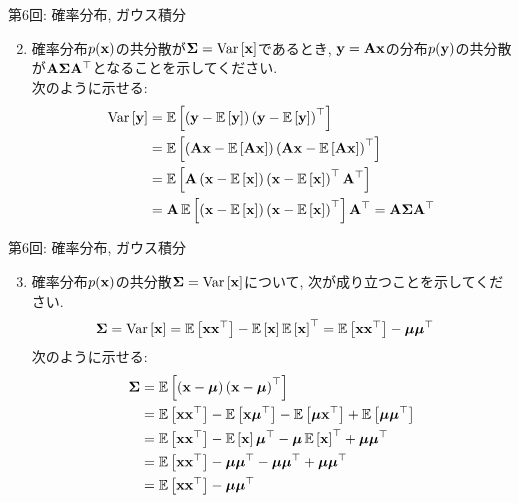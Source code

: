 \documentclass[dvipdfmx,notheorems,t]{beamer}
\begin{document}
\begin{frame}{第6回: 確率分布, ガウス積分}
\begin{enumerate}
  \setcounter{enumi}{1}
  \item 確率分布$p(\vb{x})$の共分散が$\vb{\Sigma} = \Var{\vb{x}}$であるとき,
  $\vb{y} = \vb{A} \vb{x}$の分布$p(\vb{y})$の共分散が$\vb{A} \vb{\Sigma} \vb{A}^\top$となることを示してください. \\
  次のように示せる:
  \begin{align*}
    \Var{\vb{y}}
    &= \E{\left( \vb{y} - \E{\vb{y}} \right) \left( \vb{y} - \E{\vb{y}} \right)^\top} \\
    &= \E{\left( \vb{A} \vb{x} - \E{\vb{A} \vb{x}} \right)
      \left( \vb{A} \vb{x} - \E{\vb{A} \vb{x}} \right)^\top} \\
    &= \E{\vb{A} \left( \vb{x} - \E{\vb{x}} \right) \left( \vb{x} - \E{\vb{x}} \right)^\top \vb{A}^\top} \\
    &= \vb{A} \E{\left( \vb{x} - \E{\vb{x}} \right) \left( \vb{x} - \E{\vb{x}} \right)^\top} \vb{A}^\top
    = \vb{A} \vb{\Sigma} \vb{A}^\top
  \end{align*}
\end{enumerate}
\end{frame}

\begin{frame}{第6回: 確率分布, ガウス積分}
\begin{enumerate}
  \setcounter{enumi}{2}
  \item 確率分布$p(\vb{x})$の共分散$\vb{\Sigma} = \Var{\vb{x}}$について, 次が成り立つことを示してください.
  \begin{align*}
    \vb{\Sigma} &= \Var{\vb{x}} = \E{\vb{x} \vb{x}^\top} - \E{\vb{x}} \E{\vb{x}}^\top
      = \E{\vb{x} \vb{x}^\top} - \vb*{\mu} \vb*{\mu}^\top
  \end{align*}
  次のように示せる:
  \begin{align*}
    \vb{\Sigma} &= \E{\left( \vb{x} - \vb*{\mu} \right) \left( \vb{x} - \vb*{\mu} \right)^\top} \\
      &= \E{\vb{x} \vb{x}^\top} - \E{\vb{x} \vb*{\mu}^\top}
        - \E{\vb*{\mu} \vb{x}^\top} + \E{\vb*{\mu} \vb*{\mu}^\top} \\
      &= \E{\vb{x} \vb{x}^\top} - \E{\vb{x}} \vb*{\mu}^\top
        - \vb*{\mu} \E{\vb{x}}^\top + \vb*{\mu} \vb*{\mu}^\top \\
      &= \E{\vb{x} \vb{x}^\top} - \vb*{\mu} \vb*{\mu}^\top
        - \vb*{\mu} \vb*{\mu}^\top + \vb*{\mu} \vb*{\mu}^\top \\
      &= \E{\vb{x} \vb{x}^\top} - \vb*{\mu} \vb*{\mu}^\top
  \end{align*}
\end{enumerate}
\end{frame}
\end{document}
